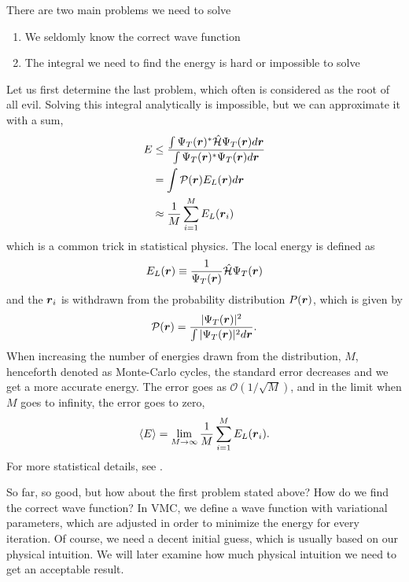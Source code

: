 There are two main problems we need to solve
\begin{enumerate}
	\item We seldomly know the correct wave function
	\item The integral we need to find the energy is hard or impossible to solve
\end{enumerate}
Let us first determine the last problem, which often is considered as the root of all evil. Solving this integral analytically is impossible, but we can approximate it with a sum,
\begin{align}
E &\leq \frac{\int\Psi_T(\boldsymbol{{r}})^*\hat{\mathcal{H}}\Psi_T(\boldsymbol{{r}}) d\boldsymbol{{r}}}{\int\Psi_T(\boldsymbol{{r}})^*\Psi_T(\boldsymbol{{r}}) d\boldsymbol{{r}}} \notag\\
& = \int \mathcal{P}(\boldsymbol{{r}}) E_L(\boldsymbol{{r}}) d\boldsymbol{{r}} \notag\\
& \approx \frac{1}{M}\sum_{i=1}^ME_L(\boldsymbol{{r}}_i) \label{eq:energysum}
\end{align}
which is a common trick in statistical physics. The local energy is defined as
\begin{equation}
E_L(\boldsymbol{{r}})\equiv\frac{1}{\Psi_T(\boldsymbol{{r}})}\hat{\mathcal{H}}\Psi_T(\boldsymbol{{r}})
\label{eq:local energy}
\end{equation}
and the $\boldsymbol{{r}}_i$ is withdrawn from the probability distribution $P(\boldsymbol{{r}})$, which is given by
\begin{equation}
\mathcal{P}(\boldsymbol{{r}})=\frac{|\Psi_T(\boldsymbol{{r}})|^2}{\int|\Psi_T(\boldsymbol{{r}})|^2d\boldsymbol{{r}}}.
\end{equation}
When increasing the number of energies drawn from the distribution, $M$, henceforth denoted as Monte-Carlo cycles, the standard error decreases and we get a more accurate energy. The error goes as $\mathcal{O}(1/\sqrt{M})$, and in the limit when $M$ goes to infinity, the error goes to zero,
\begin{equation}
\langle E\rangle=\lim_{M\to\infty} \frac{1}{M}\sum_{i=1}^ME_L(\boldsymbol{{r}}_i).
\end{equation}
For more statistical details, see \cite{deb_variational_2014}. 

So far, so good, but how about the first problem stated above? How do we find the correct wave function? In VMC, we define a wave function with variational parameters, which are adjusted in order to minimize the energy for every iteration. Of course, we need a decent initial guess, which is usually based on our physical intuition. We will later examine how much physical intuition we need to get an acceptable result. 

